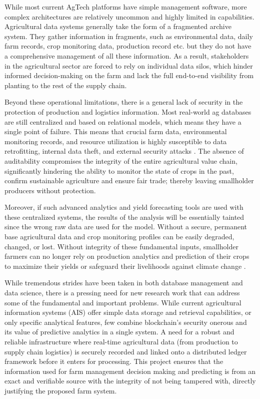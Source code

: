 While most current AgTech platforms have simple management software, more complex architectures are relatively uncommon and highly limited in capabilities. Agricultural data systems generally take the form of a fragmented archive system. They gather information in fragments, such as environmental data, daily farm records, crop monitoring data, production record etc. but they do not have a comprehensive management of all these information. As a result, stakeholders in the agricultural sector are forced to rely on individual data silos, which hinder informed decision-making on the farm and lack the full end-to-end visibility from planting to the rest of the supply chain.

Beyond these operational limitations, there is a general lack of security in the protection of production and logistics information. Most real-world ag databases are still centralized and based on relational models, which means they have a single point of failure. This means that crucial farm data, environmental monitoring records, and resource utilization is highly susceptible to data retrofitting, internal data theft, and external security attacks \parencite{aliyu2023blockchain}. The absence of auditability compromises the integrity of the entire agricultural value chain, significantly hindering the ability to monitor the state of crops in the past, confirm sustainable agriculture and ensure fair trade; thereby leaving smallholder producers without protection.

Moreover, if such advanced analytics and yield forecasting tools are used with these centralized systems, the results of the analysis will be essentially tainted since the wrong raw data are used for the model. Without a secure, permanent base agricultural data and crop monitoring profiles can be easily degraded, changed, or lost. Without integrity of these fundamental inputs, smallholder farmers can no longer rely on production analytics and prediction of their crops to maximize their yields or safeguard their livelihoods against climate change \parencite{layek2025secured}.

While tremendous strides have been taken in both database management and data science, there is a pressing need for new research work that can address some of the fundamental and important problems. While current agricultural information systems (AIS) offer simple data storage and retrieval capabilities, or only specific analytical features, few combine blockchain's security onerous and its value of predictive analytics in a single system. A need for a robust and reliable infrastructure where real-time agricultural data (from production to supply chain logistics) is securely recorded and linked onto a distributed ledger framework before it enters for processing. This project ensures that the information used for farm management decision making and predicting is from an exact and verifiable source with the integrity of not being tampered with, directly justifying the proposed farm system.

